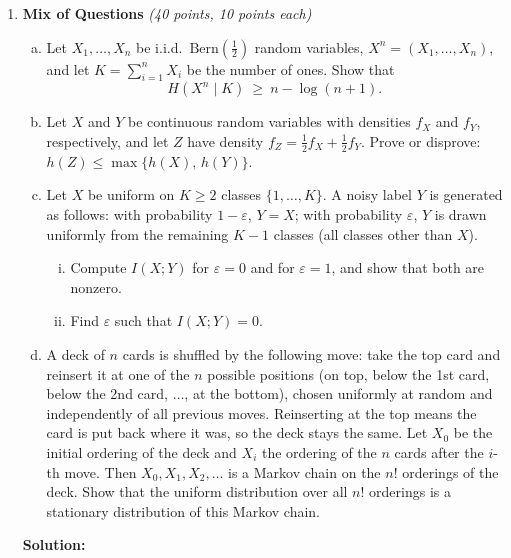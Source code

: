 \documentclass[12pt]{article}
\newcommand{\Bern}{{\mbox{Bern}}}
\begin{document}
\begin{enumerate}

\item {\bf Mix of Questions} {\it (40 points, 10 points each)}

\begin{enumerate}[a)]

\item Let $X_1,\dots,X_n$ be i.i.d.\ $\Bern(\frac12)$ random variables, $X^n=(X_1,\dots,X_n)$, and let $K=\sum_{i=1}^n X_i$ be the number of ones. Show that
\[
H(X^n\mid K)\ \ge\ n-\log(n+1).
\]

\item Let $X$ and $Y$ be continuous random variables with densities $f_X$ and $f_Y$, respectively, and let $Z$ have density $f_Z=\frac12 f_X+\frac12 f_Y$. Prove or disprove: $h(Z)\le\max\{h(X),\,h(Y)\}$.

\item Let $X$ be uniform on $K\ge 2$ classes $\{1,\dots,K\}$. A noisy label $Y$ is generated as follows: with probability $1-\varepsilon$, $Y=X$; with probability $\varepsilon$, $Y$ is drawn uniformly from the remaining $K-1$ classes (all classes other than $X$).
\begin{enumerate}[i)]
\item Compute $I(X;Y)$ for $\varepsilon=0$ and for $\varepsilon=1$, and show that both are nonzero.
\item Find $\varepsilon$ such that $I(X;Y)=0$.
\end{enumerate}

\item A deck of $n$ cards is shuffled by the following move: take the top card and reinsert it at one of the $n$ possible positions (on top, below the 1st card, below the 2nd card, $\dots$, at the bottom), chosen uniformly at random and independently of all previous moves. Reinserting at the top means the card is put back where it was, so the deck stays the same. Let $X_0$ be the initial ordering of the deck and $X_i$ the ordering of the $n$ cards after the $i$-th move. Then $X_0,X_1,X_2,\dots$ is a Markov chain on the $n!$ orderings of the deck. Show that the uniform distribution over all $n!$ orderings is a stationary distribution of this Markov chain.
\end{enumerate}

\begin{solution}
\vskip 0.2in
{\bf Solution:}


\end{solution}
\end{enumerate}
\end{document}
